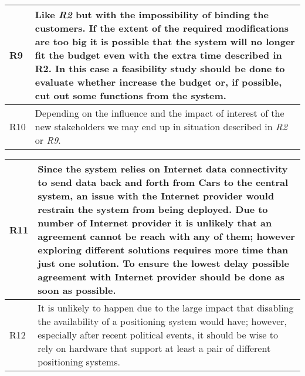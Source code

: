 \begin{tabular}{| l | p{13cm}  |}
\hline
R9 & Like \textit{R2} but with the impossibility of binding the customers. If the extent of the required modifications are too big it is possible that the system will no longer fit the budget even with the extra time described in R2. In this case a feasibility study should be done to evaluate whether increase the budget or, if possible, cut out some functions from the system.\\
\hline
R10 & Depending on the influence and the impact of interest of the new stakeholders we may end up in situation described in \textit{R2} or \textit{R9}.\\
\hline
\end{tabular}
\noindent
\begin{tabular}{| l | p{13cm}  |}
\hline
R11 & Since the system relies on Internet data connectivity to send data back and forth from Cars to the central system, an issue with the Internet provider would restrain the system from being deployed. Due to number of Internet provider it is unlikely that an agreement cannot be reach with any of them; however exploring different solutions requires more time than just one solution. To ensure the lowest delay possible agreement with Internet provider should be done as soon as possible.\\
\hline
R12 & It is unlikely to happen due to the large impact that disabling the availability of a positioning system would have; however, especially after recent political events, it should be wise to rely on hardware that support at least a pair of different positioning systems.\\ 
\hline
\end{tabular}